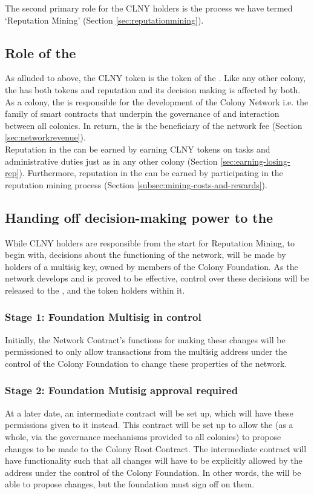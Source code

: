 The second primary role for the CLNY holders is the process we have termed `Reputation Mining' (Section \ref{sec:reputationmining}).

\subsection{Role of the \rc}
As alluded to above, the CLNY token is the token of the \rc. Like any other colony, the \rc has both tokens and reputation and its decision making is affected by both.\\
As a colony, the \rc is responsible for the development of the Colony Network i.e. the family of smart contracts that underpin the governance of and interaction between all colonies. In return, the \rc is the beneficiary of the network fee (Section \ref{sec:networkrevenue}).\\
Reputation in the \rc can be earned by earning CLNY tokens on tasks and administrative duties just as in any other colony (Section \ref{sec:earning-losing-rep}). Furthermore, reputation in the \rc can be earned by participating in the reputation mining process (Section \ref{subsec:mining-costs-and-rewards}).

\subsection{Handing off decision-making power to the \rc}\label{subsec:ceding-control-to-rc}
While CLNY holders are responsible from the start for Reputation Mining, to begin with, decisions about the functioning of the network, will be made by holders of a multisig key, owned by members of the Colony Foundation. As the network develops and is proved to be effective, control over these decisions will be released to the \rc, and the token holders within it.

\subsubsection*{Stage 1: Foundation Multisig in control}
Initially, the Network Contract's functions for making these changes will be permissioned to only allow transactions from the multisig address under the control of the Colony Foundation to change these properties of the network. 

\subsubsection*{Stage 2: Foundation Mutisig approval required}
At a later date, an intermediate contract will be set up, which will have these permissions given to it instead. This contract will be set up to allow the \rc (as a whole, via the governance mechanisms provided to all colonies) to propose changes to be made to the Colony Root Contract. The intermediate contract will have functionality such that all changes will have to be explicitly allowed by the address under the control of the Colony Foundation. In other words, the \rc will be able to propose changes, but the foundation must sign off on them.

